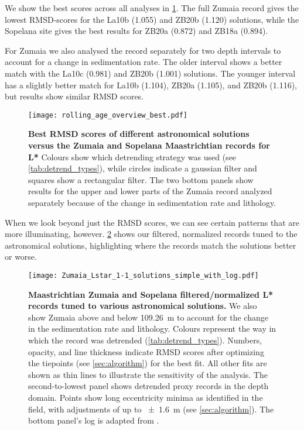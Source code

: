 \documentclass[draft]{agujournal2019}
\begin{document}
We show the best scores across all analyses in \cref{fig:rolling-rmsd}.
The full Zumaia record gives the lowest \gls{RMSD}-scores for the La10b (\num{1.055}) and ZB20b (\num{1.120}) solutions,
while the Sopelana site gives the best results for ZB20a (\num{0.872}) and ZB18a (\num{0.894}).

For Zumaia we also analysed the record separately for two depth intervals to account for a change in sedimentation rate.
The older interval shows a better match with the La10c (\num{0.981}) and ZB20b (1.001) solutions.
The younger interval has a slightly better match for La10b (\num{1.104}), ZB20a (\num{1.105}), and ZB20b (\num{1.116}), but results show similar \gls{RMSD} scores.

\begin{figure}[htb]
  \centering
  \texttt{[image: rolling\_age\_overview\_best.pdf]}
  \caption{\label{fig:rolling-rmsd}
    \textbf{Best \gls{RMSD} scores of different astronomical solutions versus the Zumaia and Sopelana Maastrichtian records for \gls{L*}}
    Colours show which detrending strategy was used (see \cref{tab:detrend_types}), while circles indicate a gaussian filter and squares show a rectangular filter.
    The two bottom panels show results for the upper and lower parts of the Zumaia record analyzed separately because of the change in sedimentation rate and lithology.
}
\end{figure}


When we look beyond just the \gls{RMSD} scores, we can see certain patterns that are more illuminating, however.
\cref{fig:rolling-depth-age} shows our filtered, normalized records tuned to the astronomical solutions, highlighting where the records match the solutions better or worse.

\begin{figure}[htb]
  \centering
  \texttt{[image: Zumaia\_Lstar\_1-1\_solutions\_simple\_with\_log.pdf]}
  \caption{\label{fig:rolling-depth-age}
    \textbf{Maastrichtian Zumaia and Sopelana filtered/normalized \gls{L*} records tuned to various astronomical solutions.}
    We also show Zumaia above and below \qty{109.26}{\metre} to account for the change in the sedimentation rate and lithology.
    Colours represent the way in which the record was detrended (\cref{tab:detrend_types}).
    Numbers, opacity, and line thickness indicate \gls{RMSD} scores after optimizing the tiepoints (see \cref{sec:algorithm}) for the best fit.
    All other fits are shown as thin lines to illustrate the sensitivity of the analysis.
    The second-to-lowest panel shows detrended proxy records in the depth domain.
    Points show long eccentricity minima as identified in the field, with adjustments of up to \qty{\pm1.6}{\metre} (see \cref{sec:algorithm}).
    The bottom panel's log is adapted from .
    }
\end{figure}
\end{document}

